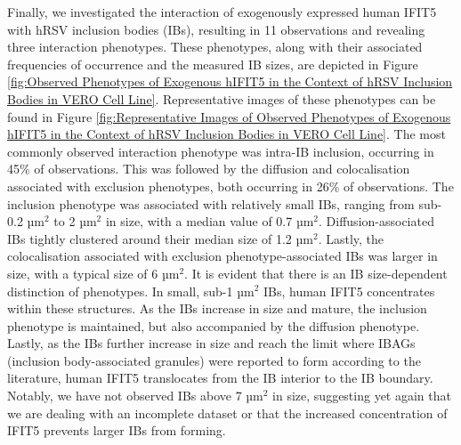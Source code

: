 Finally, we investigated the interaction of exogenously expressed human IFIT5 with hRSV inclusion bodies (IBs), resulting in 11 observations and revealing three interaction phenotypes. These phenotypes, along with their associated frequencies of occurrence and the measured IB sizes, are depicted in Figure \ref{fig:Observed Phenotypes of Exogenous hIFIT5 in the Context of hRSV Inclusion Bodies in VERO Cell Line}. Representative images of these phenotypes can be found in Figure \ref{fig:Representative Images of Observed Phenotypes of Exogenous hIFIT5 in the Context of hRSV Inclusion Bodies in VERO Cell Line}. The most commonly observed interaction phenotype was intra-IB inclusion, occurring in 45\% of observations. This was followed by the diffusion and colocalisation associated with exclusion phenotypes, both occurring in 26\% of observations. The inclusion phenotype was associated with relatively small IBs, ranging from sub-0.2 \(\mbox{µm}^2\) to 2 \(\mbox{µm}^2\) in size, with a median value of 0.7 \(\mbox{µm}^2\). Diffusion-associated IBs tightly clustered around their median size of 1.2 \(\mbox{µm}^2\). Lastly, the colocalisation associated with exclusion phenotype-associated IBs was larger in size, with a typical size of 6 \(\mbox{µm}^2\). It is evident that there is an IB size-dependent distinction of phenotypes. In small, sub-1 \(\mbox{µm}^2\) IBs, human IFIT5 concentrates within these structures. As the IBs increase in size and mature, the inclusion phenotype is maintained, but also accompanied by the diffusion phenotype. Lastly, as the IBs further increase in size and reach the limit where IBAGs (inclusion body-associated granules) were reported to form according to the literature, human IFIT5 translocates from the IB interior to the IB boundary. Notably, we have not observed IBs above 7 \(\mbox{µm}^2\) in size, suggesting yet again that we are dealing with an incomplete dataset or that the increased concentration of IFIT5 prevents larger IBs from forming.

